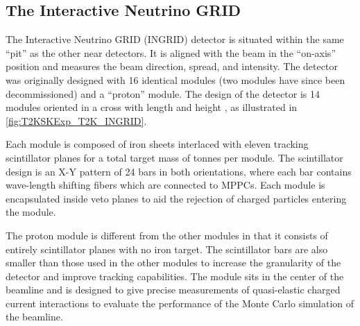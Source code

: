 \subsection{The Interactive Neutrino GRID}
\label{subsec:T2KSKExp_T2K_INGRID}

The Interactive Neutrino GRID (INGRID) detector is situated within the same ``pit'' as the other near detectors. It is aligned with the beam in the ``on-axis'' position and measures the beam direction, spread, and intensity. The detector was originally designed with 16 identical modules \cite{t2k_det} (two modules have since been decommissioned) and a ``proton'' module. The design of the detector is 14 modules oriented in a cross with length and height , as illustrated in \autoref{fig:T2KSKExp_T2K_INGRID}.

Each module is composed of iron sheets interlaced with eleven tracking scintillator planes for a total target mass of  tonnes per module. The scintillator design is an X-Y pattern of 24 bars in both orientations, where each bar contains wave-length shifting fibers which are connected to MPPCs. Each module is encapsulated inside veto planes to aid the rejection of charged particles entering the module.

The proton module is different from the other modules in that it consists of entirely scintillator planes with no iron target. The scintillator bars are also smaller than those used in the other modules to increase the granularity of the detector and improve tracking capabilities. The module sits in the center of the beamline and is designed to give precise measurements of quasi-elastic charged current interactions to evaluate the performance of the Monte Carlo simulation of the beamline. 

